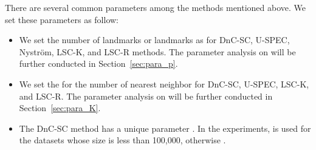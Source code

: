 \documentclass[a4paper,fleqn]{cas-dc}
\begin{document}
There are several common parameters among the methods mentioned above. We set these parameters as follow:
\begin{itemize}
  \item We set the number of landmarks or landmarks as  for DnC-SC, U-SPEC, Nystr\"{o}m, LSC-K, and LSC-R methods. The parameter analysis on  will be further conducted in Section~\ref{sec:para_p}.
  \item We set the  for the number of nearest neighbor for DnC-SC, U-SPEC, LSC-K, and LSC-R.
        The parameter analysis on  will be further conducted in Section~\ref{sec:para_K}.
  \item The DnC-SC method has a unique parameter . In the experiments,  is used for the datasets whose size is less than 100,000, otherwise .
\end{itemize}
\end{document}
